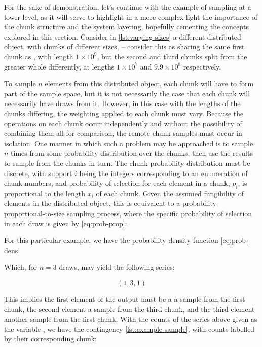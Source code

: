 For the sake of demonstration, let's continue with the example of sampling at a lower level, as it will serve to highlight in a more complex light the importance of the chunk structure and the system layering, hopefully cementing the concepts explored in this section.
Consider in \cref{lst:varying-sizes} a different distributed object, with chunks of different sizes,  -- consider this as sharing the same first chunk as , with length \(1 \times 10^9\), but the second and third chunks split from the greater whole differently, at lengths \(1 \times 10^7\) and \(9.9 \times 10^8\) respectively.


To sample \(n\) elements from this distributed object, each chunk will have to form part of the sample space, but it is not necessarily the case that each chunk will necessarily have draws from it.
However, in this case with the lengths of the chunks differing, the weighting applied to each chunk must vary.
Because the operations on each chunk occur independently and without the possibility of combining them all for comparison, the remote chunk samples must occur in isolation.
One manner in which such a problem may be approached is to sample \(n\) times from some probability distribution over the chunks, then use the results to sample from the chunks in turn.
The chunk probability distribution must be discrete, with support \(i\) being the integers corresponding to an enumeration of chunk numbers, and probability of selection for each element in a chunk, \(p_i\), is proportional to the length \(x_i\) of each chunk.
Given the assumed fungibility of elements in the distributed object, this is equivalent to a probability-proportional-to-size sampling process, where the specific probability of selection in each draw is given by \cref{eq:prob-prop}:


For this particular example, we have the probability density function \cref{eq:prob-dens}


Which, for \(n=3\) draws, may yield the following series:

\[ (1, 3, 1) \]

This implies the first element of the output must be a a sample from the first chunk, the second element a sample from the third chunk, and the third element another sample from the first chunk.
With the counts of the series above given as the variable , we have the contingency \cref{lst:example-sample}, with counts labelled by their corresponding chunk:


